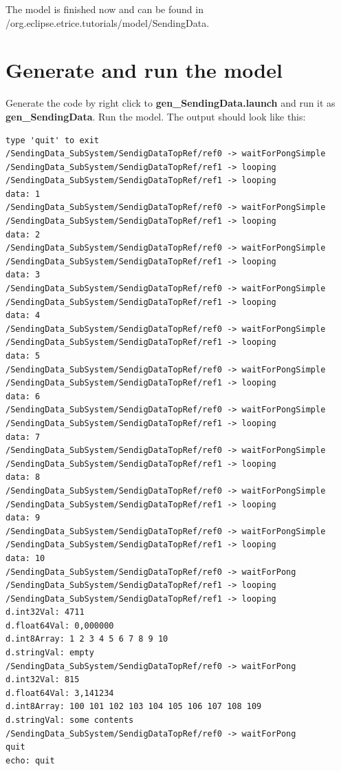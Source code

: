 \begin{flushleft}The model is finished now and can be found in /org.eclipse.etrice.tutorials/model/SendingData.\end{flushleft}

\section{Generate and run the model}

Generate the code by right click to \textbf{gen\_SendingData.launch} and run it as \textbf{gen\_SendingData}. Run the model. 
The output should look like this:

\begin{verbatim}
type 'quit' to exit
/SendingData_SubSystem/SendigDataTopRef/ref0 -> waitForPongSimple
/SendingData_SubSystem/SendigDataTopRef/ref1 -> looping
/SendingData_SubSystem/SendigDataTopRef/ref1 -> looping
data: 1
/SendingData_SubSystem/SendigDataTopRef/ref0 -> waitForPongSimple
/SendingData_SubSystem/SendigDataTopRef/ref1 -> looping
data: 2
/SendingData_SubSystem/SendigDataTopRef/ref0 -> waitForPongSimple
/SendingData_SubSystem/SendigDataTopRef/ref1 -> looping
data: 3
/SendingData_SubSystem/SendigDataTopRef/ref0 -> waitForPongSimple
/SendingData_SubSystem/SendigDataTopRef/ref1 -> looping
data: 4
/SendingData_SubSystem/SendigDataTopRef/ref0 -> waitForPongSimple
/SendingData_SubSystem/SendigDataTopRef/ref1 -> looping
data: 5
/SendingData_SubSystem/SendigDataTopRef/ref0 -> waitForPongSimple
/SendingData_SubSystem/SendigDataTopRef/ref1 -> looping
data: 6
/SendingData_SubSystem/SendigDataTopRef/ref0 -> waitForPongSimple
/SendingData_SubSystem/SendigDataTopRef/ref1 -> looping
data: 7
/SendingData_SubSystem/SendigDataTopRef/ref0 -> waitForPongSimple
/SendingData_SubSystem/SendigDataTopRef/ref1 -> looping
data: 8
/SendingData_SubSystem/SendigDataTopRef/ref0 -> waitForPongSimple
/SendingData_SubSystem/SendigDataTopRef/ref1 -> looping
data: 9
/SendingData_SubSystem/SendigDataTopRef/ref0 -> waitForPongSimple
/SendingData_SubSystem/SendigDataTopRef/ref1 -> looping
data: 10
/SendingData_SubSystem/SendigDataTopRef/ref0 -> waitForPong
/SendingData_SubSystem/SendigDataTopRef/ref1 -> looping
/SendingData_SubSystem/SendigDataTopRef/ref1 -> looping
d.int32Val: 4711
d.float64Val: 0,000000
d.int8Array: 1 2 3 4 5 6 7 8 9 10 
d.stringVal: empty
/SendingData_SubSystem/SendigDataTopRef/ref0 -> waitForPong
d.int32Val: 815
d.float64Val: 3,141234
d.int8Array: 100 101 102 103 104 105 106 107 108 109 
d.stringVal: some contents
/SendingData_SubSystem/SendigDataTopRef/ref0 -> waitForPong
quit
echo: quit
\end{verbatim}

